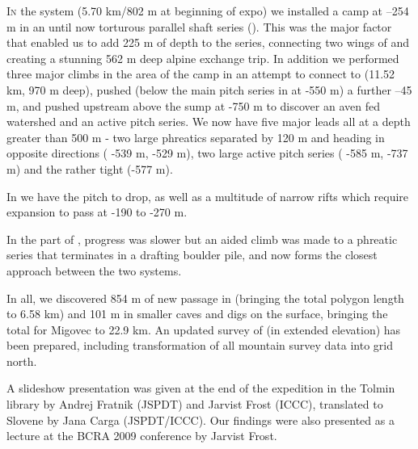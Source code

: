 \thispagestyle{endchapter}

\begin{tcolorbox}
\vspace{80pt}

\lettrine{I}{n} the  system (5.70 km/802 m at beginning of expo) we
installed a camp at --254 m in an until now torturous parallel shaft
series (). This was the major factor that enabled
us to add 225 m of depth to the  series,
connecting two wings of  and creating a stunning 562 m
deep alpine exchange trip. In addition we performed three major climbs
in the area of the camp in an attempt to connect  to
 (11.52 km, 970 m deep), pushed 
(below the main pitch series in  at -550 m) a further
--45 m, and pushed upstream above the  sump at -750 m to
discover an aven fed watershed and an active pitch series. We now have
five major leads all at a depth greater than 500 m - two large phreatics separated by 120 m and heading in opposite
directions ( -539 m,  -529 m), two
large active pitch series ( -585 m, 
-737 m) and the rather tight  (-577 m).

In  we have the  pitch to drop, as well as a multitude of narrow rifts which
require expansion to pass at -190 to -270 m.

In the  part of , progress was slower but an
aided climb was made to a phreatic series that terminates in a drafting
boulder pile, and now forms the closest approach between the two
systems.

In all, we discovered 854 m of new passage in  (bringing
the total polygon length to 6.58 km) and 101 m in smaller caves and digs
on the surface, bringing the total for Migovec to 22.9 km. An updated
survey of  (in extended elevation) has been prepared,
including transformation of all mountain survey data into grid north.

A slideshow presentation was given
at the end of the expedition in the Tolmin library by Andrej Fratnik
(JSPDT) and Jarvist Frost (ICCC), translated to Slovene by Jana Carga
(JSPDT/ICCC). Our findings were also presented as a lecture at the BCRA
2009 conference by Jarvist Frost.

\end{tcolorbox}
\BgThispage
